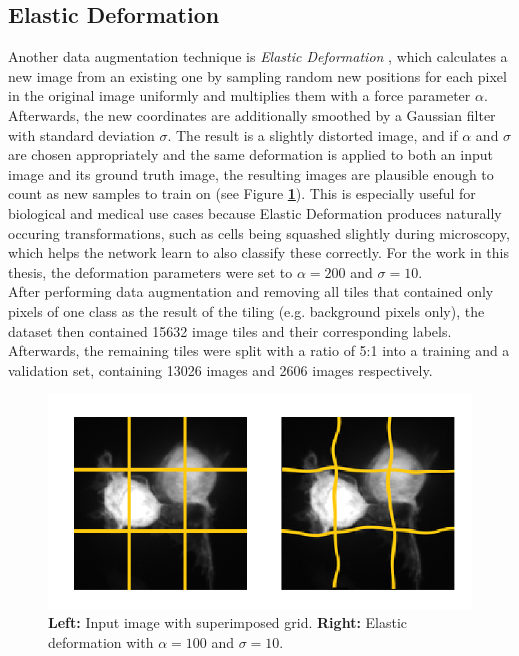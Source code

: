 		\subsection{Elastic Deformation}
Another data augmentation technique is \textit{Elastic Deformation} \cite{elastic}, which calculates a new image from an existing one by sampling random new positions for each pixel in the original image uniformly and multiplies them with a force parameter $\alpha$. Afterwards, the new coordinates are additionally smoothed by a Gaussian filter with standard deviation $\sigma$. The result is a slightly distorted image, and if $\alpha$ and $\sigma$ are chosen appropriately and the same deformation is applied to both an input image and its ground truth image, the resulting images are plausible enough to count as new samples to train on (see Figure \textbf{\ref{fig:elastic}}). This is especially useful for biological and medical use cases because Elastic Deformation produces naturally occuring transformations, such as cells being squashed slightly during microscopy, which helps the network learn to also classify these correctly. For the work in this thesis, the deformation parameters were set to $\alpha = 200$ and $\sigma = 10$.\\

\noindent After performing data augmentation and removing all tiles that contained only pixels of one class as the result of the tiling (e.g. background pixels only), the dataset then contained 15632 image tiles and their corresponding labels. Afterwards, the remaining tiles were split with a ratio of 5:1 into a training and a validation set, containing 13026 images and 2606 images respectively.



\begin {figure}[!ht]
	\begin{center}
		\includegraphics[scale=0.80]{img/fig_elastic.png}
	\end{center}
	\caption[Elastic deformation.]{\textbf{Left:} Input image with superimposed grid. \textbf{Right:} Elastic deformation with $\alpha = 100$ and $\sigma = 10$.}
	\label{fig:elastic}
\end {figure}



